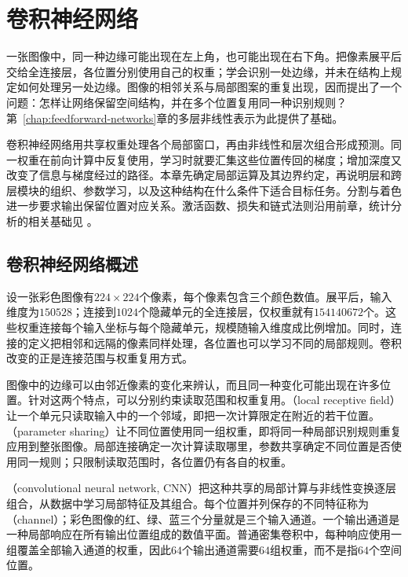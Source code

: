 \chapter{卷积神经网络}
\label{chap:convolutional-networks}

一张图像中，同一种边缘可能出现在左上角，也可能出现在右下角。把像素展平后交给全连接层，各位置分别使用自己的权重；学会识别一处边缘，并未在结构上规定如何处理另一处边缘。图像的相邻关系与局部图案的重复出现，因而提出了一个问题：怎样让网络保留空间结构，并在多个位置复用同一种识别规则？第~\ref{chap:feedforward-networks}章的多层非线性表示为此提供了基础。

卷积神经网络用共享权重处理各个局部窗口，再由非线性和层次组合形成预测。同一权重在前向计算中反复使用，学习时就要汇集这些位置传回的梯度；增加深度又改变了信息与梯度经过的路径。本章先确定局部运算及其边界约定，再说明层和跨层模块的组织、参数学习，以及这种结构在什么条件下适合目标任务。分割与着色进一步要求输出保留位置对应关系。激活函数、损失和链式法则沿用前章，统计分析的相关基础见
。

\section{卷积神经网络概述}
\label{sec:cnn-overview}

设一张彩色图像有$224\times224$个像素，每个像素包含三个颜色数值。展平后，输入维度为$150528$；连接到$1024$个隐藏单元的全连接层，仅权重就有$154140672$个。这些权重连接每个输入坐标与每个隐藏单元，规模随输入维度成比例增加。同时，连接的定义把相邻和远隔的像素同样处理，各位置也可以学习不同的局部规则。卷积改变的正是连接范围与权重复用方式。

图像中的边缘可以由邻近像素的变化来辨认，而且同一种变化可能出现在许多位置。针对这两个特点，可以分别约束读取范围和权重复用。（local receptive field）让一个单元只读取输入中的一个邻域，即把一次计算限定在附近的若干位置。（parameter sharing）让不同位置使用同一组权重，即将同一种局部识别规则重复应用到整张图像。局部连接确定一次计算读取哪里，参数共享确定不同位置是否使用同一规则；只限制读取范围时，各位置仍有各自的权重。

（convolutional neural network, CNN）把这种共享的局部计算与非线性变换逐层组合，从数据中学习局部特征及其组合。每个位置并列保存的不同特征称为（channel）；彩色图像的红、绿、蓝三个分量就是三个输入通道。一个输出通道是一种局部响应在所有输出位置组成的数值平面。普通密集卷积中，每种响应使用一组覆盖全部输入通道的权重，因此$64$个输出通道需要$64$组权重，而不是指$64$个空间位置。

